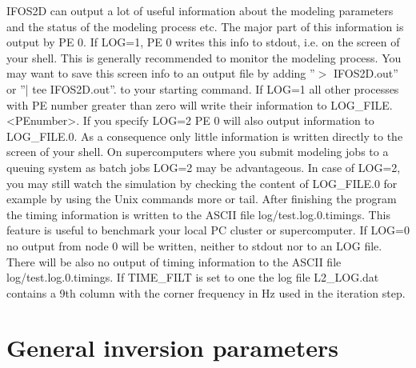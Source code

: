 IFOS2D can output a lot of useful information about the modeling parameters and the status of the modeling process etc. The major part of this information is output by PE 0.
If LOG=1, PE 0 writes this info to stdout, i.e. on the screen of your shell. This is generally recommended to monitor the modeling process. You may want to save this screen info to an output file by adding ''$>$ IFOS2D.out'' or ''| tee IFOS2D.out''. to your starting command. If LOG=1 all other processes with PE number greater than zero will write their information to LOG\_FILE.<PEnumber>. If you specify LOG=2 PE 0 will also output information to LOG\_FILE.0. As a consequence only little information is written directly to the screen of your shell. On supercomputers where you submit modeling jobs to a queuing system as batch jobs LOG=2 may be advantageous. In case of LOG=2, you may still watch the simulation by checking the content of LOG\_FILE.0 for example by using the Unix commands more or tail. After finishing the program the timing information is written to the ASCII file log/test.log.0.timings. This feature is useful to benchmark your local PC cluster or supercomputer. If LOG=0 no output from node 0 will be written, neither to stdout nor to an LOG file. There will be also no output of timing information to the ASCII file log/test.log.0.timings.
If TIME\_FILT is set to one the log file L2\_LOG.dat contains a 9th column with the corner frequency in Hz used in the iteration step.

\newpage


\section{General inversion parameters}
{\color{blue}{\begin{verbatim}
"General inversion parameters" : "comment",
			"ITERMAX" : "10",
			"DATA_DIR" : "su/measured_data/IFOS2D_real",
			"PARAMETERIZATION" : "1",
			"FORWARD_ONLY" : "0",
			"ADJOINT_TYPE" : "1",
			"MISFIT_LOG_FILE" : "L2_LOG.dat",
			"VELOCITY" : "0",

"Inversion for ..." : "comment",
			"INV_RHO_ITER" : "0",
			"INV_VP_ITER" : "0",
			"INV_VS_ITER" : "0",
\end{verbatim}}}

{\color{red}{\begin{verbatim}
Default values are:
MISFIT_LOG_FILE=L2_LOG.dat
VELOCITY=0
INV_RHO_ITER=0
INV_VP_ITER=0
INV_VS_ITER=0
\end{verbatim}}}

